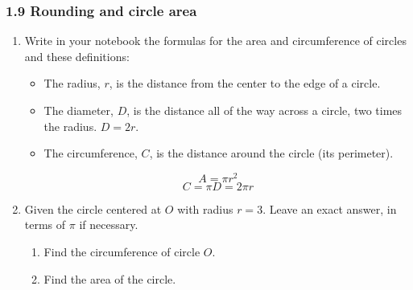 

\fancyhead[LE]{\thepage}



\subsubsection*{1.9 Rounding and circle area}
\begin{enumerate}
\item Write in your notebook the formulas for the area and circumference of circles and these definitions:
\begin{itemize}
  \item The radius, $r$, is the distance from the center to the edge of a circle. 
  \item The diameter, $D$, is the distance all of the way across a circle, two times the radius. $D=2r$. 
  \item The circumference, $C$, is the distance around the circle (its perimeter).
  
\end{itemize}
  \[A=\pi r^2\]
  \[C=\pi D = 2\pi r\]
  
\item Given the circle centered at $O$ with radius $r=3$. Leave an exact answer, in terms of $\pi$ if necessary.
  \begin{multicols}{2}
    \begin{enumerate}
      \item Find the circumference of circle $O$. %
      \item Find the area of the circle.\vspace{2cm}
    \end{enumerate}
  \end{multicols}


\end{enumerate}
